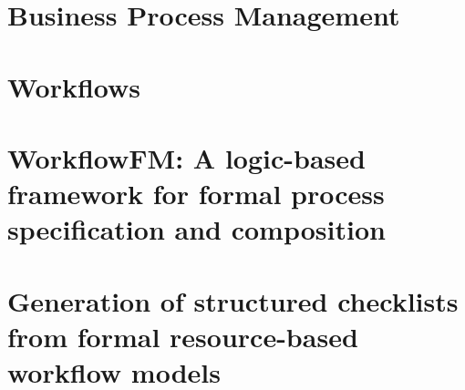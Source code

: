 \section{Business Process Management}


\section{Workflows}


\section{WorkflowFM: A logic-based framework for formal process specification and composition}


\section{Generation of structured checklists from formal resource-based workflow models}
